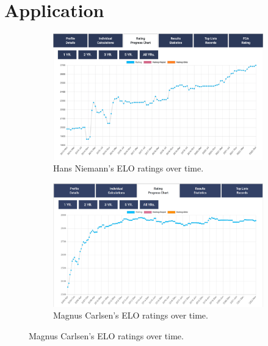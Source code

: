 \documentclass[12pt]{article}
\begin{document}
\section*{Application}
\label{sec:app}

\begin{figure}
    \begin{subfigure}{.5\textwidth}
    \includegraphics[scale=0.2]{niemann_rating.png}
    \caption{Hans Niemann's ELO ratings over time. \citep{hansniemannrating}}
    \label{fig:sfig1}
    \end{subfigure}

    \begin{subfigure}{.5\textwidth}
    \includegraphics[scale=0.45]{carlsen_rating.png}
    \caption{Magnus Carlsen's ELO ratings over time. \citep{hansniemannrating}}
    \label{fig:sfig2}
    \end{subfigure}
\label{fig:fig}
\end{figure}
\end{document}
